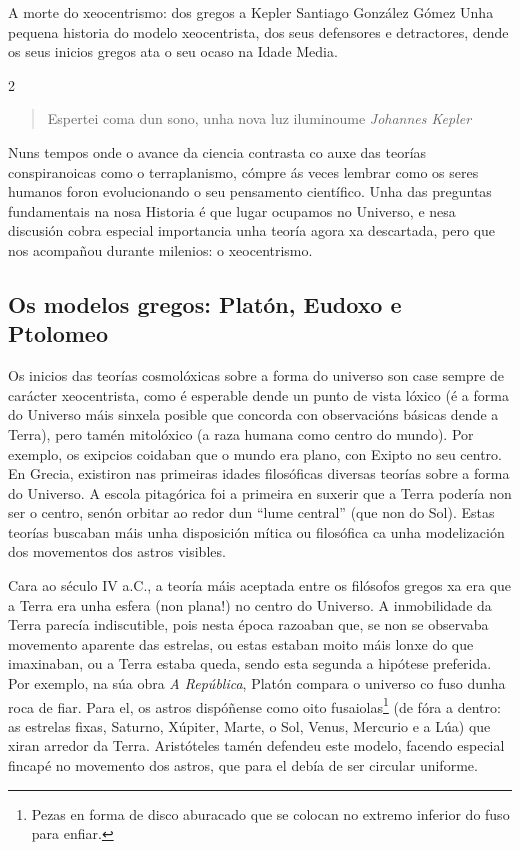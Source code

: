 \Titular*%
{historia}
{A morte do xeocentrismo: dos gregos a Kepler}
{Santiago González Gómez}
{Unha pequena historia do modelo xeocentrista, dos seus defensores e
detractores, dende os seus inicios gregos ata o seu ocaso na Idade Media.}


\begin{refsection}
\begin{multicols}{2}

\begin{quotation}
Espertei coma dun sono, unha nova luz iluminoume
\textit{Johannes Kepler}
\end{quotation}

Nuns tempos onde o avance da ciencia contrasta co auxe das teorías
conspiranoicas como o terraplanismo, cómpre ás veces lembrar como os seres
humanos foron evolucionando o seu pensamento científico. Unha das preguntas
fundamentais na nosa Historia é que lugar ocupamos no Universo, e nesa
discusión cobra especial importancia unha teoría agora xa descartada, pero que
nos acompañou durante milenios: o xeocentrismo.

\subsection*{Os modelos gregos: Platón, Eudoxo e \\ Ptolomeo}

Os inicios das teorías cosmolóxicas sobre a forma do universo son case sempre
de carácter xeocentrista, como é esperable dende un punto de vista lóxico (é a
forma do Universo máis sinxela posible que concorda con observacións básicas
dende a Terra), pero tamén mitolóxico (a raza humana como centro do mundo). Por
exemplo, os exipcios coidaban que o mundo era plano, con Exipto no seu centro.
En Grecia, existiron nas primeiras idades filosóficas diversas teorías sobre a
forma do Universo. A escola pitagórica foi a primeira en suxerir que a Terra
podería non ser o centro, senón orbitar ao redor dun ``lume central'' (que non
do Sol). Estas teorías buscaban máis unha disposición mítica ou filosófica ca
unha modelización dos movementos dos astros visibles.

Cara ao século IV a.C., a teoría máis aceptada entre os filósofos gregos xa era
que a Terra era unha esfera (non plana!) no centro do Universo. A inmobilidade
da Terra parecía indiscutible, pois nesta época razoaban que, se non se
observaba movemento aparente das estrelas, ou estas estaban moito máis lonxe do
que imaxinaban, ou a Terra estaba queda, sendo esta segunda a hipótese
preferida. Por exemplo, na súa obra \textit{A República}, Platón compara o
universo co fuso dunha roca de fiar. Para el, os astros dispóñense como oito
fusaiolas\footnote{Pezas en forma de disco aburacado que se colocan no extremo
inferior do fuso para enfiar.} (de fóra a dentro: as estrelas fixas, Saturno,
Xúpiter, Marte, o Sol, Venus, Mercurio e a Lúa) que xiran arredor da Terra.
Aristóteles tamén defendeu este modelo, facendo especial fincapé no movemento
dos astros, que para el debía de ser circular uniforme.


\end{multicols}
\end{refsection}
